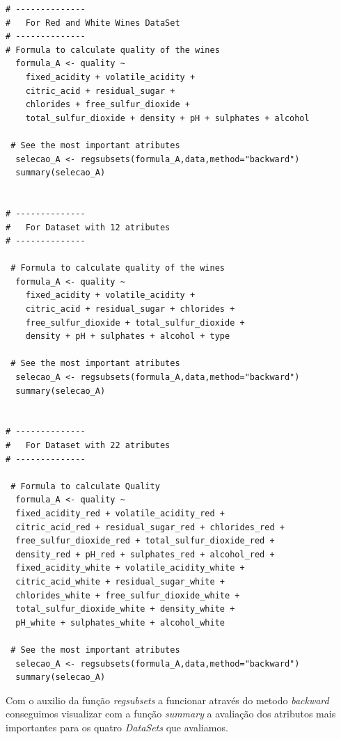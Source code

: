 \documentclass{report}
\begin{document}
\begin{verbatim}
# --------------
#	For Red and White Wines DataSet
# --------------
# Formula to calculate quality of the wines 
  formula_A <- quality ~ 
  	fixed_acidity + volatile_acidity + 
  	citric_acid + residual_sugar + 
  	chlorides + free_sulfur_dioxide + 
  	total_sulfur_dioxide + density + pH + sulphates + alcohol
 
 # See the most important atributes
  selecao_A <- regsubsets(formula_A,data,method="backward")
  summary(selecao_A)


# --------------
#	For Dataset with 12 atributes
# --------------

 # Formula to calculate quality of the wines
  formula_A <- quality ~ 
  	fixed_acidity + volatile_acidity + 
  	citric_acid + residual_sugar + chlorides + 
  	free_sulfur_dioxide + total_sulfur_dioxide + 
  	density + pH + sulphates + alcohol + type
 
 # See the most important atributes
  selecao_A <- regsubsets(formula_A,data,method="backward")
  summary(selecao_A)


# --------------
#	For Dataset with 22 atributes
# --------------

 # Formula to calculate Quality
  formula_A <- quality ~ 
  fixed_acidity_red + volatile_acidity_red + 
  citric_acid_red + residual_sugar_red + chlorides_red +
  free_sulfur_dioxide_red + total_sulfur_dioxide_red + 
  density_red + pH_red + sulphates_red + alcohol_red + 
  fixed_acidity_white + volatile_acidity_white + 
  citric_acid_white + residual_sugar_white + 
  chlorides_white + free_sulfur_dioxide_white + 
  total_sulfur_dioxide_white + density_white + 
  pH_white + sulphates_white + alcohol_white 
 
 # See the most important atributes
  selecao_A <- regsubsets(formula_A,data,method="backward")
  summary(selecao_A)
\end{verbatim}


Com o auxilio da função \textit{regsubsets} a funcionar através do metodo \textit{backward} conseguimos visualizar com a função \textit{summary} a avaliação dos atributos mais importantes para os quatro \textit{DataSets} que avaliamos.
\end{document}
